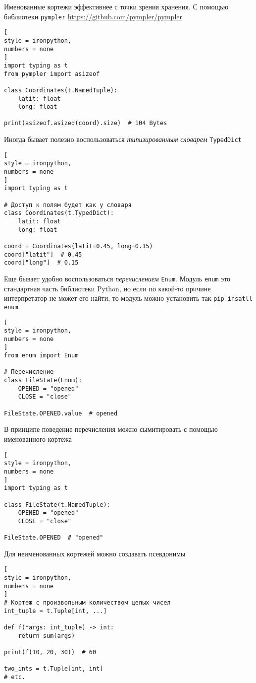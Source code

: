\documentclass[%
	11pt,
	a4paper,
	utf8,
		]{article}
\begin{document}
Именованные кортежи эффективнее с точки зрения хранения. С помощью библиотеки \verb|pympler| \url{https://github.com/pympler/pympler}
\begin{lstlisting}[
style = ironpython,
numbers = none
]
import typing as t
from pympler import asizeof

class Coordinates(t.NamedTuple):
    latit: float
    long: float
    
print(asizeof.asized(coord).size)  # 104 Bytes
\end{lstlisting}

Иногда бывает полезно воспользоваться \emph{типизированным словарем} \verb|TypedDict|
\begin{lstlisting}[
style = ironpython,
numbers = none	
]
import typing as t

# Доступ к полям будет как у словаря
class Coordinates(t.TypedDict):
    latit: float
    long: float
    
coord = Coordinates(latit=0.45, long=0.15)
coord["latit"]  # 0.45
coord["long"]  # 0.15
\end{lstlisting}

Еще бывает удобно воспользоваться \emph{перечислением} \verb|Enum|. Модуль \verb|enum| это стандартная часть библиотеки Python, но если по какой-то причине интерпретатор не может его найти, то модуль можно установить так \verb|pip insatll enum|
\begin{lstlisting}[
style = ironpython,
numbers = none
]
from enum import Enum

# Перечисление
class FileState(Enum):
    OPENED = "opened"
    CLOSE = "close"
    
FileState.OPENED.value  # opened
\end{lstlisting}

В принципе поведение перечисления можно сымитировать с помощью именованного кортежа
\begin{lstlisting}[
style = ironpython,
numbers = none	
]
import typing as t

class FileState(t.NamedTuple):
    OPENED = "opened"
    CLOSE = "close"
    
FileState.OPENED  # "opened"
\end{lstlisting}

Для неименованных кортежей можно создавать псевдонимы
\begin{lstlisting}[
style = ironpython,
numbers = none
]
# Кортеж с произвольным количеством целых чисел
int_tuple = t.Tuple[int, ...]

def f(*args: int_tuple) -> int:
    return sum(args)
    
print(f(10, 20, 30))  # 60

two_ints = t.Tuple[int, int]
# etc.
\end{lstlisting}
\end{document}
